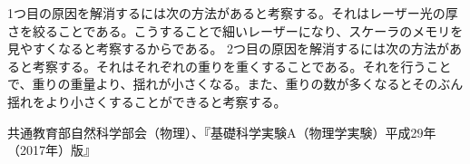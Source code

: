 \documentclass{jsarticle}
\begin{document}
1つ目の原因を解消するには次の方法があると考察する。それはレーザー光の厚さを絞ることである。こうすることで細いレーザーになり、スケーラのメモリを見やすくなると考察するからである。
2つ目の原因を解消するには次の方法があると考察する。それはそれぞれの重りを重くすることである。それを行うことで、重りの重量より、揺れが小さくなる。また、重りの数が多くなるとそのぶん揺れをより小さくすることができると考察する。

\begin{thebibliography}{99}
     共通教育部自然科学部会（物理）、『基礎科学実験A（物理学実験）平成29年（2017年）版』
\end{thebibliography}
\end{document}
